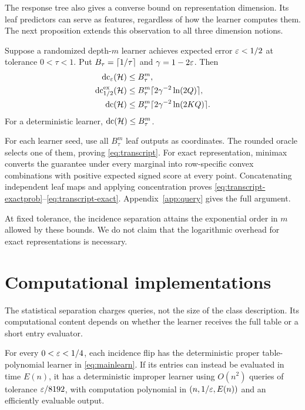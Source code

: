 The response tree also gives a converse bound on representation dimension. Its leaf predictors can serve as features, regardless of how the learner computes them. The next proposition extends this observation to all three dimension notions.

\begin{proposition}\label{prop:transcript}
Suppose a randomized depth-$m$ learner achieves expected error $\varepsilon<1/2$ at tolerance $0<\tau<1$. Put $B_\tau=\lceil 1/\tau\rceil$ and $\gamma=1-2\varepsilon$. Then
\begin{align}
 \operatorname{dc}_\varepsilon(\mathcal H)&\le B_\tau^m,\label{eq:transcript}\\
 \operatorname{dc}^{\mathrm{ex}}_{1/2}(\mathcal H)&\le B_\tau^m\lceil 2\gamma^{-2}\ln(2Q)\rceil,\label{eq:transcript-exactprob}\\
 \operatorname{dc}(\mathcal H)&\le B_\tau^m\lceil 2\gamma^{-2}\ln(2KQ)\rceil.\label{eq:transcript-exact}
\end{align}
For a deterministic learner, $\operatorname{dc}(\mathcal H)\le B_\tau^m$.
\end{proposition}

For each learner seed, use all $B_\tau^m$ leaf outputs as coordinates. The rounded oracle selects one of them, proving \eqref{eq:transcript}. For exact representation, minimax converts the guarantee under every marginal into row-specific convex combinations with positive expected signed score at every point. Concatenating independent leaf maps and applying concentration proves \eqref{eq:transcript-exactprob}--\eqref{eq:transcript-exact}. Appendix~\ref{app:query} gives the full argument.

At fixed tolerance, the incidence separation attains the exponential order in $m$ allowed by these bounds. We do not claim that the logarithmic overhead for exact representations is necessary.



\section{Computational implementations}\label{sec:computation}
The statistical separation charges queries, not the size of the class description. Its computational content depends on whether the learner receives the full table or a short entry evaluator.

\begin{theorem}\label{thm:table}
For every $0<\varepsilon<1/4$, each incidence flip has the deterministic proper table-polynomial learner in \eqref{eq:mainlearn}. If its entries can instead be evaluated in time $E(n)$, it has a deterministic improper learner using $O(n^2)$ queries of tolerance $\varepsilon/8192$, with computation polynomial in $(n,1/\varepsilon,E(n))$ and an efficiently evaluable output.
\end{theorem}

